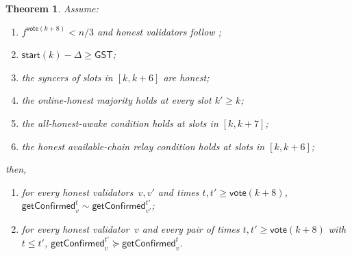 \ifx\litemode\undefined\documentclass{article}\fi
\newcommand{\start}{\mathsf{start}}
\newcommand{\vote}{\mathsf{vote}}
\newcommand{\getConfirmed}{\textsf{getConfirmed}\xspace}
\theoremstyle{plain}
\newtheorem{theorem}{Theorem}
\theoremstyle{definition}
\theoremstyle{remark}
\newcommand{\GST}{\ensuremath{\mathsf{GST}}}
\newcommand{\OHM}{online-honest majority\xspace}
\newcommand{\HAR}{honest available-chain relay\xspace}
\newcommand{\AHA}{all-honest-awake\xspace}
\begin{document}
\begin{theorem}
Assume:
\begin{enumerate}
  \item $f^{\vote(k+8)} < n/3$ and honest validators follow ;
  \item $\start(k) - \Delta \geq \GST$;
  \item the syncers of slots in $[k, k+6]$ are honest;
  \item the \OHM holds at every slot $k' \geq k$;
  \item the \AHA condition holds at slots in $[k, k+7]$;
  \item the \HAR condition holds at slots in $[k, k+6]$;
\end{enumerate}
then,
\begin{enumerate}
  \item for every honest validators~$v,v'$ and times $t, t' \geq \vote(k+8)$, $\getConfirmed_v^{t} \sim \getConfirmed_{v'}^{t'}$;
  \item for every honest validator~$v$ and every pair of times $t, t' \geq \vote(k+8)$ with $t \leq t'$, $\getConfirmed_v^{t'} \succeq \getConfirmed_v^t$.
\end{enumerate}
\end{theorem}
\end{document}

